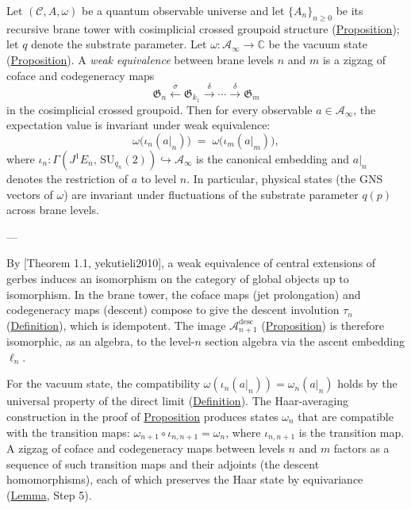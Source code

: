 \begin{proposition}
  \label{prop:weak-equiv-invariance}
Let $(\mathcal{C}, A, \omega)$ be a quantum observable universe and let
$\{A_n\}_{n \geq 0}$ be its recursive brane tower with cosimplicial
crossed groupoid structure
(\hyperref[prop:cosimplicial-crossed-groupoid]{Proposition}); let $q$ denote the substrate parameter.  Let
$\omega \colon \mathcal{A}_\infty \to \mathbb{C}$ be the vacuum state
(\hyperref[prop:vacuum-state]{Proposition}).  A \emph{weak equivalence} between
brane levels $n$ and $m$ is a zigzag of coface and codegeneracy maps
\[
\mathfrak{G}_n
  \xleftarrow{\;\sigma\;}
  \mathfrak{G}_{k_1}
  \xrightarrow{\;\delta\;}
  \cdots
  \xrightarrow{\;\delta\;}
  \mathfrak{G}_m
\]
in the cosimplicial crossed groupoid.  Then for every observable
$a \in \mathcal{A}_\infty$, the expectation value is invariant under
weak equivalence:
\[
\omega\!\bigl(\iota_n(a|_n)\bigr)
  \;=\;
  \omega\!\bigl(\iota_m(a|_m)\bigr),
\]
where $\iota_n \colon \Gamma(J^1 E_n,\, \mathrm{SU}_{q_n}(2))
\hookrightarrow \mathcal{A}_\infty$ is the canonical embedding and
$a|_n$ denotes the restriction of $a$ to level $n$.  In particular,
physical states (the GNS vectors of $\omega$) are invariant under
fluctuations of the substrate parameter $q(p)$ across brane levels.

---

By [Theorem 1.1, yekutieli2010], a weak equivalence of central
extensions of gerbes induces an isomorphism on the category of global
objects up to isomorphism.  In the brane tower, the coface maps (jet
prolongation) and codegeneracy maps (descent) compose to give the descent
involution $\tau_n$ (\hyperref[def:descent-involution]{Definition}), which is
idempotent.  The image $\mathcal{A}_{n+1}^{\mathrm{desc}}$
(\hyperref[prop:descent-eigenspaces]{Proposition}) is therefore isomorphic, as
an algebra, to the level-$n$ section algebra via the ascent embedding
$\ell_n$.

For the vacuum state, the compatibility
$\omega(\iota_n(a|_n)) = \omega_n(a|_n)$ holds by the universal property
of the direct limit (\hyperref[def:direct-limit-algebra]{Definition}).  The
Haar-averaging construction in the proof of
\hyperref[prop:vacuum-state]{Proposition} produces states $\omega_n$ that are
compatible with the transition maps:
$\omega_{n+1} \circ \iota_{n,n+1} = \omega_n$, where
$\iota_{n,n+1}$ is the transition map.  A zigzag of coface and
codegeneracy maps between levels $n$ and $m$ factors as a sequence of
such transition maps and their adjoints (the descent homomorphisms),
each of which preserves the Haar state by equivariance
(\hyperref[lem:descent]{Lemma}, Step 5).


\end{proposition}
